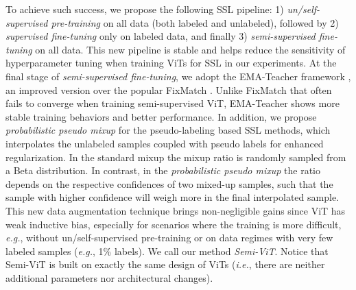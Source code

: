 \documentclass{article}
\newcommand\ie{\emph{i.e.}}
\newcommand\eg{\emph{e.g.}}
\begin{document}
To achieve such success, we propose the following SSL pipeline: 1) \textit{un/self-supervised pre-training} on all data (both labeled and unlabeled), followed by 2) \textit{supervised fine-tuning} only on labeled data, and finally 3) \textit{semi-supervised fine-tuning} on all data. This new pipeline is stable and helps reduce the sensitivity of hyperparameter tuning when training ViTs for SSL in our experiments. At the final stage of \textit{semi-supervised fine-tuning}, we adopt the EMA-Teacher framework \cite{DBLP:conf/nips/TarvainenV17,DBLP:conf/cvpr/CaiRMFTS21}, an improved version over the popular FixMatch \cite{DBLP:conf/nips/SohnBCZZRCKL20}. Unlike FixMatch that often fails to converge when training semi-supervised ViT, EMA-Teacher shows more stable training behaviors and better performance. 
In addition, we propose \emph{probabilistic pseudo mixup} for the pseudo-labeling based SSL methods, which interpolates the unlabeled samples coupled with pseudo labels for enhanced regularization. In the standard mixup \cite{DBLP:conf/iclr/ZhangCDL18} the mixup ratio is randomly sampled from a Beta distribution. In contrast, in the \emph{probabilistic pseudo mixup} the ratio depends on the respective confidences of two mixed-up samples, such that the sample with higher confidence will weigh more in the final interpolated sample. This new data augmentation technique brings non-negligible gains since ViT has weak inductive bias, especially for scenarios where the training is more difficult, \eg, without un/self-supervised pre-training or on data regimes with very few labeled samples (\eg, 1\% labels). We call our method \emph{Semi-ViT}. Notice that Semi-ViT is built on exactly the same design of ViTs (\ie, there are neither additional parameters nor architectural changes).  
\end{document}

